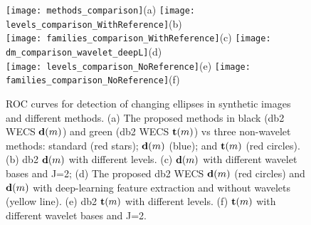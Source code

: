 \documentclass[journal]{IEEEtran}
\newcommand{\vd}{{\textbf d}}
\newcommand{\vt}{{\textbf t}}
\begin{document}
\begin{figure}[htp!]
\texttt{[image: methods\_comparison]}\hspace{-.5cm}(a) 
\texttt{[image: levels\_comparison\_WithReference]}\hspace{-.5cm}(b)\\
\texttt{[image: families\_comparison\_WithReference]}\hspace{-.5cm}(c)
\texttt{[image: dm\_comparison\_wavelet\_deepL]}\hspace{-.5cm}(d) \\
\texttt{[image: levels\_comparison\_NoReference]}\hspace{-.5cm}(e)
\texttt{[image: families\_comparison\_NoReference]}\hspace{-.5cm}(f)
\caption{ROC curves for detection of changing ellipses in synthetic images and different methods. (a) The proposed methods in black (db2 WECS $\vd(m)$) and green (db2 WECS $\vt(m)$) vs three non-wavelet methods: standard (red stars); $\vd(m)$ (blue); and $\vt(m)$ (red circles). 
(b) db2 $\vd(m)$ with different levels.
(c) $\vd(m)$ with different wavelet bases and J=2;
(d) The proposed db2 WECS $\vd(m)$ (red circles) and $\vd(m)$ with deep-learning feature extraction and without wavelets (yellow line).  
(e) db2 $\vt(m)$ with different levels. (f) $\vt(m)$ with different wavelet bases and J=2. }
\label{F:EllipsoidChanges_details}
\end{figure}
\end{document}
